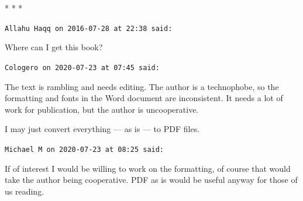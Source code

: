 
\begin{center}* * *\end{center}

\begin{footnotesize}
\begin{sffamily}
\texttt{Allahu Haqq on 2016-07-28 at 22:38 said:}

Where can I get this book?

\hfill

\texttt{Cologero on 2020-07-23 at 07:45 said:}

The text is rambling and needs editing. The author is a technophobe, so the formatting and fonts in the Word document are inconsistent. It needs a lot of work for publication, but the author is uncooperative.

I may just convert everything --- as is --- to PDF files.

\hfill

\texttt{Michael M on 2020-07-23 at 08:25 said:}

If of interest I would be willing to work on the formatting, of course that would take the author being cooperative. PDF as is would be useful anyway for those of us reading.


\hfill

\end{sffamily}
\end{footnotesize}

